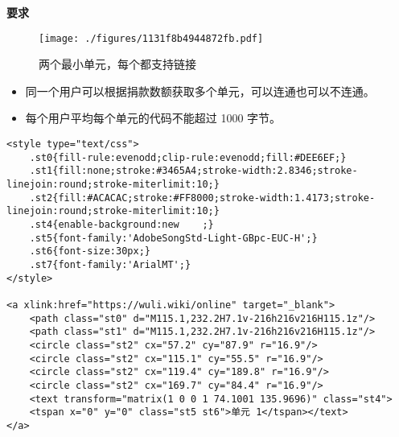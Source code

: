 
\textbf{要求}

\begin{figure}[ht]
\centering
\texttt{[image: ./figures/1131f8b4944872fb.pdf]}
\caption{两个最小单元，每个都支持链接} \label{fig_thanks_1}
\end{figure}

\begin{itemize}
\item 同一个用户可以根据捐款数额获取多个单元，可以连通也可以不连通。
\item 每个用户平均每个单元的代码不能超过 1000 字节。
\end{itemize}

\begin{lstlisting}[language=none]
<style type="text/css">
	.st0{fill-rule:evenodd;clip-rule:evenodd;fill:#DEE6EF;}
	.st1{fill:none;stroke:#3465A4;stroke-width:2.8346;stroke-linejoin:round;stroke-miterlimit:10;}
	.st2{fill:#ACACAC;stroke:#FF8000;stroke-width:1.4173;stroke-linejoin:round;stroke-miterlimit:10;}
	.st4{enable-background:new    ;}
	.st5{font-family:'AdobeSongStd-Light-GBpc-EUC-H';}
	.st6{font-size:30px;}
	.st7{font-family:'ArialMT';}
</style>

<a xlink:href="https://wuli.wiki/online" target="_blank">
	<path class="st0" d="M115.1,232.2H7.1v-216h216v216H115.1z"/>
	<path class="st1" d="M115.1,232.2H7.1v-216h216v216H115.1z"/>
	<circle class="st2" cx="57.2" cy="87.9" r="16.9"/>
	<circle class="st2" cx="115.1" cy="55.5" r="16.9"/>
	<circle class="st2" cx="119.4" cy="189.8" r="16.9"/>
	<circle class="st2" cx="169.7" cy="84.4" r="16.9"/>
	<text transform="matrix(1 0 0 1 74.1001 135.9696)" class="st4">
	<tspan x="0" y="0" class="st5 st6">单元 1</tspan></text>
</a>
\end{lstlisting}
